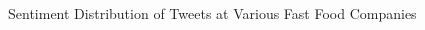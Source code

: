 \begin{figure}[]
\vspace*{-1in}
\begin{adjustwidth}{-1in}{-1in}
\begin{subfigure}[]{6cm} \centering \resizebox{\linewidth}{!}{ }  \caption{} \label{fig:chicktt} \end{subfigure} \begin{subfigure}[]{6cm} \centering \resizebox{\linewidth}{!}{ \hfill }  \caption{} \label{fig:tacott} \end{subfigure} \begin{subfigure}[]{6cm} \centering \resizebox{\linewidth}{!}{ 
 } \caption{} \label{fig:palstt} \end{subfigure}  
\begin{subfigure}[]{6cm} \centering \resizebox{\linewidth}{!}{ } \caption{} \label{fig:Chipotlett} \end{subfigure}
\begin{subfigure}[]{6cm} \centering \resizebox{\linewidth}{!}{ }  \caption{}\label{fig:Paneratt}\end{subfigure}
\end{adjustwidth}
\caption{Sentiment Distribution of Tweets at Various Fast Food Companies}
\label{mega}
\end{figure}